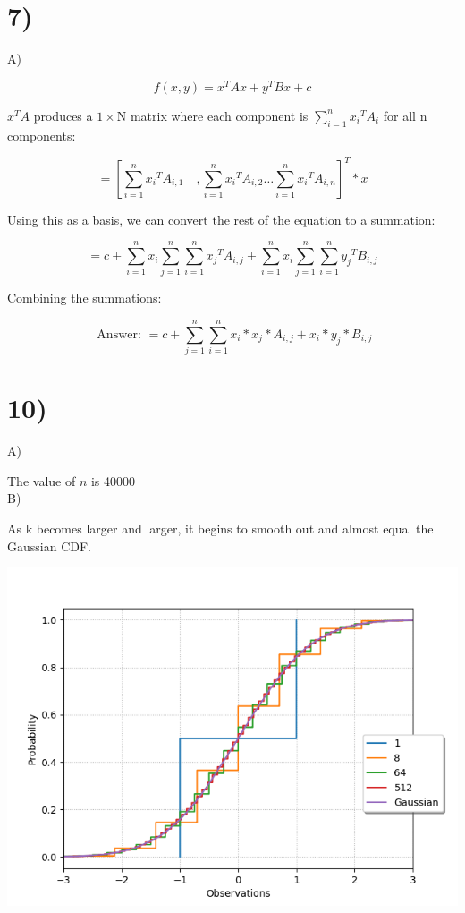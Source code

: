 \documentclass[10pt]{article}
\begin{document}
\newpage
\section*{7)}

A)

$$
f(x, y)=x^{T} A x+y^{T} B x+c
$$

$x^{T} A$ produces a $1 \times \mathrm{N}$ matrix where each component is $\sum_{i=1}^{n} x_{i}{ }^{T} A_{i}$ for all $\mathrm{n}$ components:

$$
=\left[\sum_{i=1}^{n} x_{i}{ }^{T} A_{i, 1} \quad, \sum_{i=1}^{n} x_{i}{ }^{T} A_{i, 2} \ldots \sum_{i=1}^{n} x_{i}{ }^{T} A_{i, n}\right]^{T} * x
$$

Using this as a basis, we can convert the rest of the equation to a summation:

$$
=c+\sum_{i=1}^{n} x_{i} \sum_{j=1}^{n} \sum_{i=1}^{n} x_{j}{ }^{T} A_{i, j}+\sum_{i=1}^{n} x_{i} \sum_{j=1}^{n} \sum_{i=1}^{n} y_{j}{ }^{T} B_{i, j}
$$

Combining the summations:
\begin{tcolorbox}[colback=red!5!white,colframe=red!75!black]
  \centering $$
\text { Answer: }=c+\sum_{j=1}^{n} \sum_{i=1}^{n} x_{i} * x_{j} * A_{i, j}+x_{i} * y_{j} * B_{i, j}
$$

\end{tcolorbox}


\newpage
\section*{10)}
A)

The value of $n$ is 40000\\
B)

As $\mathrm{k}$ becomes larger and larger, it begins to smooth out and almost equal the Gaussian CDF.

\begin{center}
\includegraphics[max width=\textwidth]{image/Figure_2.png}
\end{center}
\end{document}
